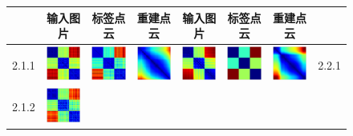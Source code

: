 \documentclass[bachelor, nocolorlinks, printoneside]{seuthesis} %
\begin{document}
\begin{Main}
\begin{figure}[ht!]
    \begin{centering}
        \begin{tabular}{cccc|cccc}
        \toprule
         &输入图片 & 标签点云 & 重建点云 & 输入图片 & 标签点云 & 重建点云& \\
        \toprule
        2.1.1 &\includegraphics[width=0.12\columnwidth,keepaspectratio]{figs/toy_triangle/cluster_converge_3by30_1_1.png} &
        \includegraphics[width=0.12\columnwidth,keepaspectratio]{figs/toy_triangle/cluster_converge_3by30_1_2.png} &
        \includegraphics[width=0.12\columnwidth,keepaspectratio]{figs/toy_triangle/cluster_converge_3by30_1_3.png} &  
        \includegraphics[width=0.12\columnwidth,keepaspectratio]{figs/toy_triangle/cluster_converge_3by16_1_1.png} &
        \includegraphics[width=0.12\columnwidth,keepaspectratio]{figs/toy_triangle/cluster_converge_3by16_1_2.png} &
        \includegraphics[width=0.12\columnwidth,keepaspectratio]{figs/toy_triangle/cluster_converge_3by16_1_3.png}& 2.2.1\\
        2.1.2 &\includegraphics[width=0.12\columnwidth,keepaspectratio]{figs/toy_triangle/cluster_converge_3by30_2_1.png} &

\end{tabular}
\end{centering}
\end{figure}
\end{Main}
\end{document}
